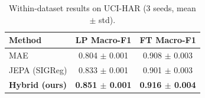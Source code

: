 \begin{table}[t]
\centering
\caption{Within-dataset results on UCI-HAR (3 seeds, mean $\pm$ std).}
\label{tab:within}
\begin{tabular}{lcc}
\toprule
Method & LP Macro-F1 & FT Macro-F1 \\
\midrule
MAE & 0.804 $\pm$ 0.001 & 0.908 $\pm$ 0.003 \\
JEPA (SIGReg) & 0.833 $\pm$ 0.001 & 0.901 $\pm$ 0.003 \\
\textbf{Hybrid (ours)} & \textbf{0.851 $\pm$ 0.001} & \textbf{0.916 $\pm$ 0.004} \\
\bottomrule
\end{tabular}
\end{table}
